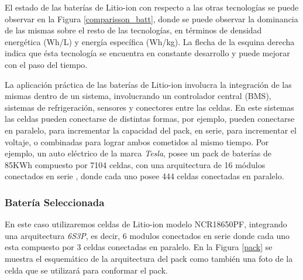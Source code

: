 \documentclass[10pt,a4paper]{article}
\begin{document}
\noindent El estado de las baterías de Litio-ion con respecto a las otras
tecnologías se puede observar en la Figura \ref{comparisson_batt}, donde se
puede observar la dominancia de las mismas sobre el resto de las tecnologías, en
términos de densidad energética (Wh/L) y energía específica (Wh/kg). La flecha
de la esquina derecha indica que ésta tecnología se encuentra en constante
desarrollo y puede mejorar con el paso del tiempo.

\noindent La aplicación práctica de las baterías de Litio-ion involucra la
integración de las mismas dentro de un sistema, involucrando un controlador
central (\acrshort{BMS}), sistemas de refrigeración, sensores y conectores entre
las celdas. En este sistemas las celdas pueden conectarse de distintas formas,
por ejemplo, pueden conectarse en paralelo, para incrementar la capacidad del
pack, en serie, para incrementar el voltaje, o combinadas para lograr ambos
cometidos al mismo tiempo. Por ejemplo, un auto eléctrico de la marca
\emph{Tesla}, posee un pack de baterías de 85KWh compuesto por 7104 celdas, con
una arquitectura de 16 módulos conectados en serie , donde cada uno posee 444
celdas conectadas en paralelo.

\subsubsection{Batería Seleccionada}\label{batSel}

\noindent En este caso utilizaremos celdas de Litio-ion modelo NCR18650PF,
integrando una arquitectura \emph{6S3P}, es decir, 6 modulos conectados en serie
donde cada uno esta compuesto por 3 celdas conectadas en paralelo.  En la Figura
\ref{pack} se muestra el esquemático de la arquitectura del pack como también
una foto de la celda que se utilizará para conformar el pack. 
\end{document}
